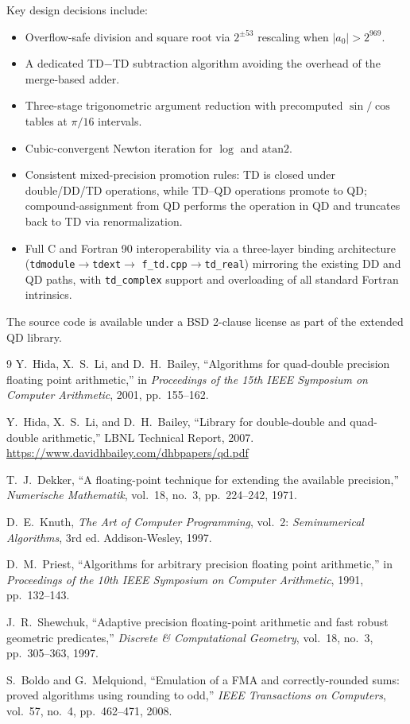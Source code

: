 \documentclass[11pt,a4paper]{article}
\begin{document}
Key design decisions include:
\begin{itemize}
\item Overflow-safe division and square root via $2^{\pm 53}$
  rescaling when $|a_0| > 2^{969}$.
\item A dedicated TD$-$TD subtraction algorithm avoiding the
  overhead of the merge-based adder.
\item Three-stage trigonometric argument reduction with precomputed
  $\sin/\cos$ tables at $\pi/16$ intervals.
\item Cubic-convergent Newton iteration for $\log$ and $\mathrm{atan2}$.
\item Consistent mixed-precision promotion rules: TD is closed under
  double/DD/TD operations, while TD--QD operations promote to QD;
  compound-assignment from QD performs the operation in QD and
  truncates back to TD via renormalization.
\item Full C and Fortran 90 interoperability via a three-layer
  binding architecture (\texttt{tdmodule}$\to$\texttt{tdext}$\to$%
  \texttt{f\_td.cpp}$\to$\texttt{td\_real}) mirroring the existing
  DD and QD paths, with \texttt{td\_complex} support and
  overloading of all standard Fortran intrinsics.
\end{itemize}

The source code is available under a BSD 2-clause license as part
of the extended QD library.

\begin{thebibliography}{9}
Y.~Hida, X.~S.~Li, and D.~H.~Bailey,
``Algorithms for quad-double precision floating point arithmetic,''
in \textit{Proceedings of the 15th IEEE Symposium on Computer
Arithmetic}, 2001, pp.~155--162.

Y.~Hida, X.~S.~Li, and D.~H.~Bailey,
``Library for double-double and quad-double arithmetic,''
LBNL Technical Report, 2007.
\url{https://www.davidhbailey.com/dhbpapers/qd.pdf}

T.~J.~Dekker,
``A floating-point technique for extending the available precision,''
\textit{Numerische Mathematik}, vol.~18, no.~3, pp.~224--242, 1971.

D.~E.~Knuth,
\textit{The Art of Computer Programming}, vol.~2:
\textit{Seminumerical Algorithms}, 3rd ed.
Addison-Wesley, 1997.

D.~M.~Priest,
``Algorithms for arbitrary precision floating point arithmetic,''
in \textit{Proceedings of the 10th IEEE Symposium on Computer
Arithmetic}, 1991, pp.~132--143.

J.~R.~Shewchuk,
``Adaptive precision floating-point arithmetic and fast robust
geometric predicates,''
\textit{Discrete \& Computational Geometry},
vol.~18, no.~3, pp.~305--363, 1997.

S.~Boldo and G.~Melquiond,
``Emulation of a FMA and correctly-rounded sums: proved algorithms
using rounding to odd,''
\textit{IEEE Transactions on Computers},
vol.~57, no.~4, pp.~462--471, 2008.
\end{thebibliography}
\end{document}
